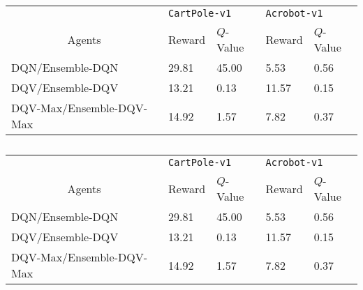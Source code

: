 \documentclass{article}
\begin{document}
\begin{table}[]
\begin{tabular}{@{}lll|ll@{}}
\toprule
\multicolumn{1}{c}{}                         & \multicolumn{2}{l|}{\texttt{CartPole-v1}} & \multicolumn{2}{l}{\texttt{Acrobot-v1}}                      \\ \cmidrule(l){2-5}
\multicolumn{1}{c}{\multirow{-2}{*}{Agents}} & Reward   & $Q$-Value                      & Reward                        & $Q$-Value                    \\ \midrule
DQN/Ensemble-DQN                             & 29.81    & \cellcolor[HTML]{FFFC9E}45.00  & \cellcolor[HTML]{FFFC9E}5.53  & \cellcolor[HTML]{FFFC9E}0.56 \\
DQV/Ensemble-DQV                             & 13.21    & 0.13                           & \cellcolor[HTML]{FFFC9E}11.57 & \cellcolor[HTML]{FFFC9E}0.15 \\
DQV-Max/Ensemble-DQV-Max                     & 14.92    & 1.57                           & \cellcolor[HTML]{FFFC9E}7.82  & \cellcolor[HTML]{FFFC9E}0.37
\end{tabular}
\caption{}
\label{tab:my-table}
\end{table}

\begin{table}[]
\begin{tabular}{@{}lll|ll@{}}
\toprule
\multicolumn{1}{c}{}                         & \multicolumn{2}{l|}{\texttt{CartPole-v1}}                  & \multicolumn{2}{l}{\texttt{Acrobot-v1}}                                           \\ \cmidrule(l){2-5}
\multicolumn{1}{c}{\multirow{-2}{*}{Agents}} & Reward                     & $Q$-Value                     & Reward                                             & $Q$-Value                    \\ \midrule
DQN/Ensemble-DQN                             & \multicolumn{1}{l|}{29.81} & \cellcolor[HTML]{FFFC9E}45.00 & \multicolumn{1}{l|}{\cellcolor[HTML]{FFFC9E}5.53}  & \cellcolor[HTML]{FFFC9E}0.56 \\ \cmidrule(l){2-5}
DQV/Ensemble-DQV                             & \multicolumn{1}{l|}{13.21} & 0.13                          & \multicolumn{1}{l|}{\cellcolor[HTML]{FFFC9E}11.57} & \cellcolor[HTML]{FFFC9E}0.15 \\ \cmidrule(l){2-5}
DQV-Max/Ensemble-DQV-Max                     & \multicolumn{1}{l|}{14.92} & 1.57                          & \multicolumn{1}{l|}{\cellcolor[HTML]{FFFC9E}7.82}  & \cellcolor[HTML]{FFFC9E}0.37 \\ \cmidrule(l){2-5}
\end{tabular}
\caption{}
\label{tab:my-table1}
\end{table}
\end{document}
